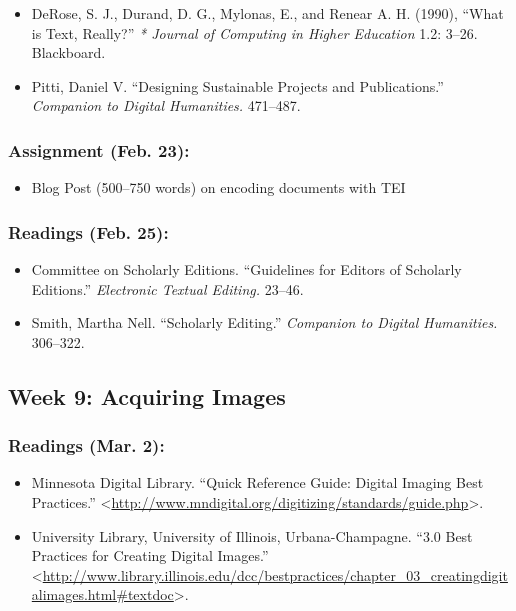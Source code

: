 \documentclass[]{article}
\begin{document}
\begin{itemize}
\itemsep1pt\parskip0pt
\item
  DeRose, S. J., Durand, D. G., Mylonas, E., and Renear A. H. (1990),
  ``What is Text, Really?'' \emph{* Journal of Computing in Higher
  Education} 1.2: 3--26. Blackboard.
\item
  Pitti, Daniel V. ``Designing Sustainable Projects and Publications.''
  \emph{Companion to Digital Humanities.} 471--487.
\end{itemize}

\subsubsection{Assignment (Feb. 23):}\label{assignment-feb.-23}

\begin{itemize}
\itemsep1pt\parskip0pt
\item
  Blog Post (500--750 words) on encoding documents with TEI
\end{itemize}

\subsubsection{Readings (Feb. 25):}\label{readings-feb.-25}

\begin{itemize}
\itemsep1pt\parskip0pt
\item
  Committee on Scholarly Editions. ``Guidelines for Editors of Scholarly
  Editions.'' \emph{Electronic Textual Editing.} 23--46.
\item
  Smith, Martha Nell. ``Scholarly Editing.'' \emph{Companion to Digital
  Humanities.} 306--322.
\end{itemize}

\subsection{Week 9: Acquiring Images}\label{week-9-acquiring-images}

\subsubsection{Readings (Mar. 2):}\label{readings-mar.-2}

\begin{itemize}
\itemsep1pt\parskip0pt
\item
  Minnesota Digital Library. ``Quick Reference Guide: Digital Imaging
  Best Practices.''
  \textless{}\url{http://www.mndigital.org/digitizing/standards/guide.php}\textgreater{}.
\item
  University Library, University of Illinois, Urbana-Champagne. ``3.0
  Best Practices for Creating Digital Images.''
  \textless{}\url{http://www.library.illinois.edu/dcc/bestpractices/chapter_03_creatingdigitalimages.html\#textdoc}\textgreater{}.
\end{itemize}
\end{document}
